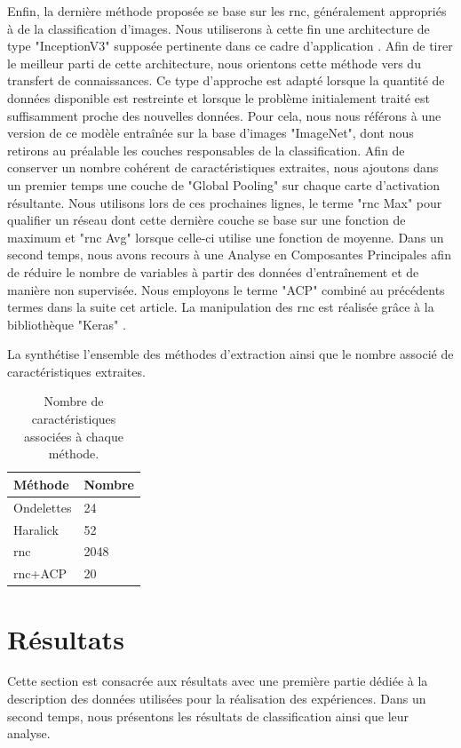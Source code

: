 \documentclass{gretsi}
\begin{document}
\begin{sloppypar}
Enfin, la dernière méthode proposée se base sur les \acs{rnc}, généralement appropriés à de la classification d'images. Nous utiliserons à cette fin une architecture de type "InceptionV3" supposée pertinente dans ce cadre d'application \cite{Litjens2017}. Afin de tirer le meilleur parti de cette architecture, nous orientons cette méthode vers du transfert de connaissances. Ce type d'approche est adapté lorsque la quantité de données disponible est restreinte et lorsque le problème initialement traité est suffisamment proche des nouvelles données. Pour cela, nous nous référons à une version de ce modèle entraînée sur la base d'images "ImageNet", dont nous retirons au préalable les couches responsables de la classification. Afin de conserver un nombre cohérent de caractéristiques extraites, nous ajoutons dans un premier temps une couche de "Global Pooling" sur chaque carte d'activation résultante. Nous utilisons lors de ces prochaines lignes, le terme "\ac{rnc} Max" pour qualifier un réseau dont cette dernière couche se base sur une fonction de maximum et "\ac{rnc} Avg" lorsque celle-ci utilise une fonction de moyenne. Dans un second temps, nous avons recours à une Analyse en Composantes Principales afin de réduire le nombre de variables à partir des données d'entraînement et de manière non supervisée. Nous employons le terme "ACP" combiné au précédents termes dans la suite cet article. La manipulation des \ac{rnc} est réalisée grâce à la bibliothèque "Keras" \cite{chollet2015keras}.\par
La  synthétise l'ensemble des méthodes d'extraction ainsi que le nombre associé de caractéristiques extraites.
\begin{table}[h]
\centering
    \begin{tabular*}{0.6\linewidth}{l@{\extracolsep{\fill}}l}
        \hline
        \textbf{Méthode} & \textbf{Nombre} \\
        \hline
        Ondelettes & 24 \\
        \hline
        Haralick & 52\\
        \hline
        \ac{rnc} & 2048\\
        \hline
        \ac{rnc}+ACP & 20\\
        \hline
    \end{tabular*}
    \caption{Nombre de caractéristiques associées à chaque méthode.}
    \label{variables}
\end{table}

\section{Résultats}
\label{resultat}
Cette section est consacrée aux résultats avec une première partie dédiée à la description des données utilisées pour la réalisation des expériences. Dans un second temps, nous présentons les résultats de classification ainsi que leur analyse.


\end{sloppypar}
\end{document}
